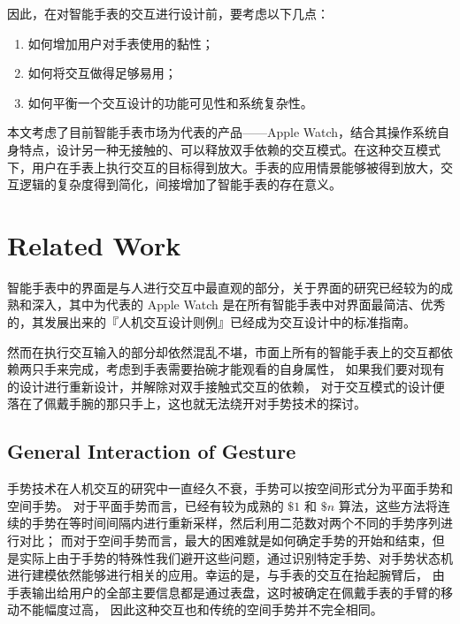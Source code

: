 因此，在对智能手表的交互进行设计前，要考虑以下几点：

\begin{enumerate}
    \kaishu
    \item 如何增加用户对手表使用的黏性；
    \item 如何将交互做得足够易用；
    \item 如何平衡一个交互设计的功能可见性和系统复杂性。
\end{enumerate}

本文考虑了目前智能手表市场为代表的产品——Apple Watch，结合其操作系统自身特点，设计另一种无接触的、可以释放双手依赖的交互模式。在这种交互模式下，用户在手表上执行交互的目标得到放大。手表的应用情景能够被得到放大，交互逻辑的复杂度得到简化，间接增加了智能手表的存在意义。

\section{Related Work}

智能手表中的界面是与人进行交互中最直观的部分\cite{liuheng2015}，关于界面的研究已经较为的成熟和深入\cite{chengshiwei2009,fuaiming2006}，其中为代表的 Apple Watch 是在所有智能手表中对界面最简洁、优秀的，其发展出来的『人机交互设计则例』\cite{WatchGuidelines:2016}已经成为交互设计中的标准指南。

然而在执行交互输入的部分却依然混乱不堪，市面上所有的智能手表上的交互都依赖两只手来完成，考虑到手表需要抬碗才能观看的自身属性，
如果我们要对现有的设计进行重新设计，并解除对双手接触式交互的依赖，
对于交互模式的设计便落在了佩戴手腕的那只手上，这也就无法绕开对手势技术的探讨。

\subsection{General Interaction of Gesture}

手势技术在人机交互的研究中一直经久不衰，手势可以按空间形式分为平面手势和空间手势。
对于平面手势而言，已经有较为成熟的 $\$1$ \cite{wobbrock2007gestures}
和 $\$n$ \cite{anthony2010lightweight}算法，这些方法将连续的手势在等时间间隔内进行重新采样，然后利用二范数对两个不同的手势序列进行对比；
而对于空间手势而言，最大的困难就是如何确定手势的开始和结束，但是实际上由于手势的特殊性我们避开这些问题，通过识别特定手势、对手势状态机进行建模依然能够进行相关的应用\cite{liuqingshui2002,chenyaxi2014,dihaijin2011,houwenjun2015,Vatavu:2014:LGT:2602299.2602316}。幸运的是，与手表的交互在抬起腕臂后，
由手表输出给用户的全部主要信息都是通过表盘，这时被确定在佩戴手表的手臂的移动不能幅度过高，
因此这种交互也和传统的空间手势并不完全相同。

